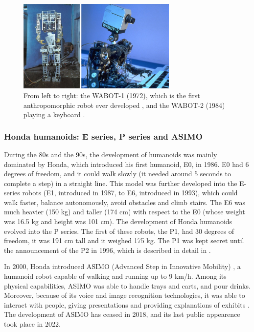 \begin{figure}
    \centering
    \includegraphics[width=0.7\textwidth]{figures/01-introduction/WABOTs.jpg}
    \caption{From left to right: the WABOT-1 (1972), which is the first anthropomorphic robot
        ever developed \cite{Kato1973TheWABOT1}, and the WABOT-2 (1984)
        playing a keyboard \cite{Kato1987WABOT2}.}
    \label{fig:introduction:WABOTs}
\end{figure}

\subsubsection{Honda humanoids: E series, P series and ASIMO}
During the 80s and the 90s, the development of humanoids was mainly dominated
by Honda, which introduced his first humanoid, E0, in 1986. E0 had 6 degrees
of freedom, and it could walk slowly (it needed around 5 seconds to complete 
a step) in a straight line. This model was further developed into the E-series 
robots (E1, introduced in 1987, to E6, introduced in 1993), which could walk 
faster, balance autonomously, avoid obstacles and climb stairs. The E6 was 
much heavier (150 kg) and taller (174 cm) with respect to the E0 (whose 
weight was 16.5 kg and height was 101 cm).
The development of Honda humanoids evolved into the P series. The first of these 
robots, the P1, had 30 degrees of freedom, it
was 191 cm tall and it weighed 175 kg. The P1 was kept secret until the 
announcement of the P2 in 1996, which is described in detail in
\cite{Hirai1998HondaP2}.

In 2000, Honda introduced ASIMO (Advanced Step in Innovative Mobility)
\cite{Sakagami2002ASIMO}, a humanoid robot capable of walking and running 
up to 9 km/h. Among its physical capabilities, ASIMO was able to handle trays 
and carts, and pour drinks. Moreover, because of its voice and image recognition
technologies, it was able to interact with people, giving presentations and 
providing explanations of exhibits \cite{Shigemi2019ASIMOandHumanoidRobotResearchatHonda}.
The development of ASIMO has ceased in 2018, and its last public appearence
took place in 2022.

